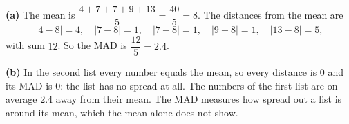 \textbf{(a)} The mean is $\dfrac{4+7+7+9+13}{5}=\dfrac{40}{5}=8$. The distances from the mean are
\[|4-8|=4,\quad|7-8|=1,\quad|7-8|=1,\quad|9-8|=1,\quad|13-8|=5,\]
with sum $12$. So the MAD is $\dfrac{12}{5}=\boxed{2.4}$.

\textbf{(b)} In the second list every number equals the mean, so every distance is $0$ and its MAD is $0$: the list has no spread at all. The numbers of the first list are on average $2.4$ away from their mean. The MAD measures how spread out a list is around its mean, which the mean alone does not show.
